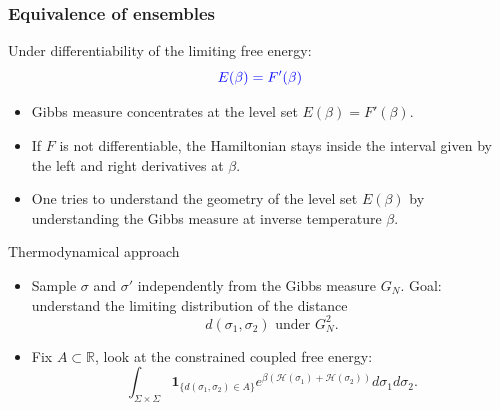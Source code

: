 \documentclass[handout]{beamer}
\begin{document}
\begin{frame}
	\frametitle{Equivalence of ensembles}
Under differentiability of the limiting free energy:	
	$$ \begin{color}{blue} E(\beta) = F'(\beta) \end{color}$$
\begin{itemize}	
\item Gibbs measure concentrates at the level set $E(\beta) = F'(\beta).$
\vspace{0.1cm}
\item If $F$ is not differentiable, the Hamiltonian stays inside the interval given by the left and right derivatives at $\beta$.
\vspace{0.1cm}
\item One tries to understand the geometry of the level set $E(\beta)$ by understanding the Gibbs measure at inverse temperature $\beta$. 
\end{itemize}

\end{frame}


\begin{frame}{Thermodynamical approach}
	
	\pause
\begin{itemize}
	\item Sample $\sigma$ and $\sigma'$ independently from the Gibbs measure $G_{N}$. Goal: understand the limiting distribution of the distance 
	$$ d(\sigma_{1}, \sigma_{2}) \text{ under } G_{N}^{2}.$$
	
	\vspace{0.1cm}
	\item Fix $A \subset \mathbb R$, look at the constrained coupled free energy: 
	$$ \int_{\Sigma \times \Sigma} \mathbf 1_{\{d(\sigma_{1}, \sigma_{2}) \in A\}} e^{\beta (\mathcal H(\sigma_{1}) + \mathcal H(\sigma_{2}))} d \sigma_{1} d \sigma_{2}.  $$

	
	\end{itemize}
		
\end{frame}
\end{document}
